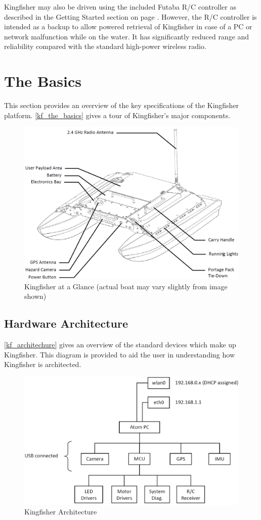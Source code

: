\documentclass[]{clearpath-latex/clearpath-manual}
\begin{document}
Kingfisher may also be driven using the included Futaba R/C controller as described in the Getting Started section on page \pageref{gettingstarted}. However, the R/C controller is intended as a backup to allow powered retrieval of Kingfisher in case of a PC or network malfunction while on the water. It has significantly reduced range and reliability compared with the standard high-power wireless radio.

\section{The Basics}
This section provides an overview of the key specifications of the Kingfisher platform. \autoref{kf_the_basics} gives a tour of Kingfisher's major components.

\begin{figure}[h]
  \centering
  \includegraphics[width=0.75\linewidth]{kf_schematic.PNG}
  \caption{Kingfisher at a Glance (actual boat may vary slightly from image shown)}
  \label{kf_the_basics}
\end{figure}
\newpage

\subsection{Hardware Architecture}
\autoref{kf_architechure} gives an overview of the standard devices which make up Kingfisher. This diagram is provided to aid the user in understanding how Kingfisher is architected.

\begin{figure}[h]
  \centering
  \includegraphics[width=0.75\linewidth]{kf_architecture.PNG}
  \caption{Kingfisher Architecture}
  \label{kf_architechure}
\end{figure}
\end{document}
